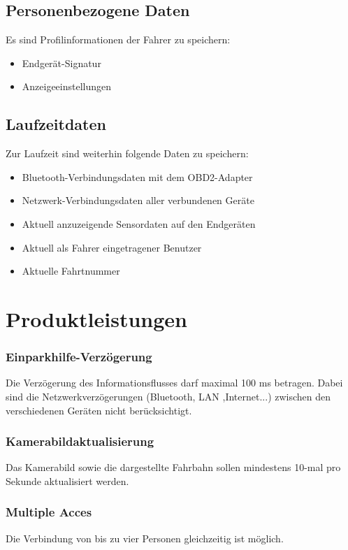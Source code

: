 \documentclass[pflichtenheft.tex]{subfiles}
\begin{document}
\section{\mkd Personenbezogene Daten}
Es sind Profilinformationen der Fahrer zu speichern:
\begin{itemize}
\item
Endgerät-Signatur
\item
Anzeigeeinstellungen

\end{itemize}

\section{\mkd Laufzeitdaten}
Zur Laufzeit sind weiterhin folgende Daten zu speichern:
\begin{itemize}
\item
Bluetooth-Verbindungsdaten mit dem OBD2-Adapter
\item
Netzwerk-Verbindungsdaten aller verbundenen Geräte
\item
Aktuell anzuzeigende Sensordaten auf den Endgeräten
\item
Aktuell als Fahrer eingetragener Benutzer
\item
Aktuelle Fahrtnummer

\end{itemize}



\chapter{Produktleistungen}

\subsection{\mkl Einparkhilfe-Verzögerung}
Die Verzögerung des Informationsflusses darf maximal 100 ms betragen. Dabei sind die Netzwerkverzögerungen (Bluetooth, LAN ,Internet...) zwischen den verschiedenen Geräten nicht berücksichtigt. 

\subsection{\mkl Kamerabildaktualisierung}
Das Kamerabild sowie die dargestellte Fahrbahn sollen mindestens 10-mal pro Sekunde aktualisiert werden.

\subsection{\mkl Multiple Acces} Die Verbindung von bis zu vier Personen gleichzeitig ist möglich.
\end{document}
